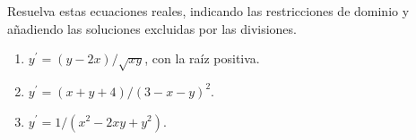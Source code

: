 Resuelva estas ecuaciones reales, indicando las restricciones de dominio y añadiendo las soluciones excluidas por las divisiones.

\begin{enumerate}[label=(\alph*),ref=\alph*,leftmargin=*]
\item $y^{\prime}=(y-2x)/\sqrt{xy}$, con la raíz positiva.
\item $y^{\prime}=(x+y+4)/(3-x-y)^2$.
\item $y^{\prime}=1/(x^2-2xy+y^2)$.
\end{enumerate}
